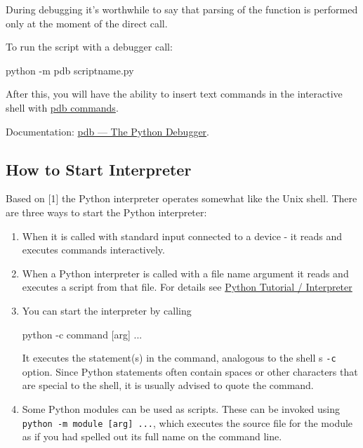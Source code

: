 \documentclass[
]{article}
\newenvironment{Shaded}{}{}
\newcommand{\AttributeTok}[1]{\textcolor[rgb]{0.49,0.56,0.16}{#1}}
\newcommand{\ExtensionTok}[1]{#1}
\newcommand{\NormalTok}[1]{#1}
\begin{document}
During debugging it's worthwhile to say that parsing of the function is
performed only at the moment of the direct call.

To run the script with a debugger call:

\begin{Shaded}
\begin{Highlighting}[]
\ExtensionTok{python} \AttributeTok{{-}m}\NormalTok{ pdb scriptname.py}
\end{Highlighting}
\end{Shaded}

After this, you will have the ability to insert text commands in the
interactive shell with
\href{https://docs.python.org/3/library/pdb.html\#debugger-commands}{pdb
commands}.

Documentation:
\href{https://docs.python.org/3/library/pdb.html?highlight=pdb\#module-pdb}{pdb
--- The Python Debugger}.

\hypertarget{how-to-start-interpreter}{%
\subsection{How to Start Interpreter}\label{how-to-start-interpreter}}

Based on {[}1{]} the Python interpreter operates somewhat like the Unix
shell. There are three ways to start the Python interpreter:

\begin{enumerate}
\def\labelenumi{\arabic{enumi}.}
\item
  When it is called with standard input connected to a device - it reads
  and executes commands interactively.
\item
  When a Python interpreter is called with a file name argument it reads
  and executes a script from that file. For details see
  \href{https://docs.python.org/3.13/tutorial/interpreter.html}{Python
  Tutorial / Interpreter}
\item
  You can start the interpreter by calling

\begin{Shaded}
\begin{Highlighting}[]
\ExtensionTok{python} \AttributeTok{{-}c}\NormalTok{ command [arg] ...}
\end{Highlighting}
\end{Shaded}

  It executes the statement(s) in the command, analogous to the shell s
  \texttt{-c} option. Since Python statements often contain spaces or
  other characters that are special to the shell, it is usually advised
  to quote the command.
\item
  Some Python modules can be used as scripts. These can be invoked using
  \texttt{python\ -m\ module\ {[}arg{]}\ ...}, which executes the source
  file for the module as if you had spelled out its full name on the
  command line.
\end{enumerate}
\end{document}
